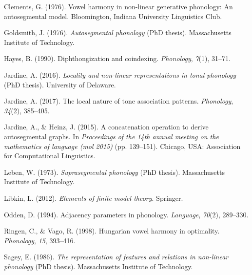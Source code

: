 \documentclass[,doc,floatsintext]{apa6}
\theoremstyle{definition}
\theoremstyle{definition}
\theoremstyle{definition}
\theoremstyle{remark}
\begin{document}
\hypertarget{ref-Clements1976}{}
Clements, G. (1976). Vowel harmony in non-linear generative phonology:
An autosegmental model. Bloomington, Indiana University Linguistics
Club.

\hypertarget{ref-Goldsmith1976}{}
Goldsmith, J. (1976). \emph{Autosegmental phonology} (PhD thesis).
Massachusetts Institute of Technology.

\hypertarget{ref-hayes1990}{}
Hayes, B. (1990). Diphthongization and coindexing. \emph{Phonology},
\emph{7}(1), 31--71.

\hypertarget{ref-jardinediss}{}
Jardine, A. (2016). \emph{Locality and non-linear representations in
tonal phonology} (PhD thesis). University of Delaware.

\hypertarget{ref-jardinelocaltone}{}
Jardine, A. (2017). The local nature of tone association patterns.
\emph{Phonology}, \emph{34}(2), 385--405.

\hypertarget{ref-jardineheinz2015}{}
Jardine, A., \& Heinz, J. (2015). A concatenation operation to derive
autosegmental graphs. In \emph{Proceedings of the 14th annual meeting on
the mathematics of language (mol 2015)} (pp. 139--151). Chicago, USA:
Association for Computational Linguistics.

\hypertarget{ref-leben1973}{}
Leben, W. (1973). \emph{Suprasegmental phonology} (PhD thesis).
Massachusetts Institute of Technology.

\hypertarget{ref-libkin2012}{}
Libkin, L. (2012). \emph{Elements of finite model theory}. Springer.

\hypertarget{ref-odden1994}{}
Odden, D. (1994). Adjacency parameters in phonology. \emph{Language},
\emph{70}(2), 289--330.

\hypertarget{ref-ringenvago1998}{}
Ringen, C., \& Vago, R. (1998). Hungarian vowel harmony in optimality.
\emph{Phonology}, \emph{15}, 393--416.

\hypertarget{ref-sagey1986}{}
Sagey, E. (1986). \emph{The representation of features and relations in
non-linear phonology} (PhD thesis). Massachusetts Institute of
Technology.

\endgroup
\end{document}
